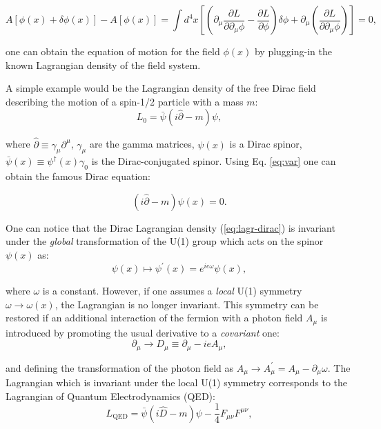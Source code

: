 \begin{equation}\label{eq:var}
    A[\phi(x) + \delta\phi(x)] - A[\phi(x)] = \int d^4x \left[\left(\partial_\mu\dfrac{\partial L}{\partial\partial_\mu\phi} - \dfrac{\partial L}{\partial \phi}\right)\delta\phi + \partial_\mu\left(\dfrac{\partial L}{\partial\partial_\mu\phi}\right)\right] = 0,
\end{equation}

one can obtain the equation of motion for the field $\phi(x)$ by plugging-in the known Lagrangian density of the field system.

A simple example would be the Lagrangian density of the free Dirac field describing the motion of a spin-1/2 particle with a mass $m$:
\begin{equation}\label{eq:lagr-dirac}
    L_0 = \bar{\psi}(i\hat{\partial} - m)\psi,
\end{equation}

where $\hat{\partial} \equiv \gamma_\mu\partial^\mu$, $\gamma_\mu$ are the gamma matrices, $\psi(x)$ is a Dirac spinor, $\bar{\psi}(x) \equiv \psi^\dag(x)\gamma_0$ is the Dirac-conjugated spinor. Using Eq. \ref{eq:var} one can obtain the famous Dirac equation:

\begin{equation}
    (i\hat{\partial} - m)\psi(x) = 0.
\end{equation}

One can notice that the Dirac Lagrangian density (\ref{eq:lagr-dirac}) is invariant under the \textit{global} transformation of the U(1) group which acts on the spinor $\psi(x)$ as:
\begin{equation}
    \psi(x) \mapsto \psi^\prime(x) = e^{ie\omega} \psi(x),
\end{equation}

where $\omega$ is a constant. However, if one assumes a \textit{local} U(1) symmetry $\omega \to \omega(x)$, the Lagrangian is no longer invariant. This symmetry can be restored if an additional interaction of the fermion with a photon field $A_\mu$ is introduced by promoting the usual derivative to a \textit{covariant} one:
\begin{equation}
    \partial_\mu \to D_\mu \equiv \partial_\mu -ieA_\mu,
\end{equation}

and defining the transformation of the photon field as $A_\mu \to A^\prime_\mu = A_\mu - \partial_\mu\omega$. The Lagrangian which is invariant under the local U(1) symmetry corresponds to the Lagrangian of Quantum Electrodynamics (QED):
\begin{equation}\label{eq:lagr-qed}
    L_\text{QED} = \bar{\psi}(i\hat{D} - m)\psi -\dfrac{1}{4}F_{\mu\nu}F^{\mu\nu},
\end{equation}


